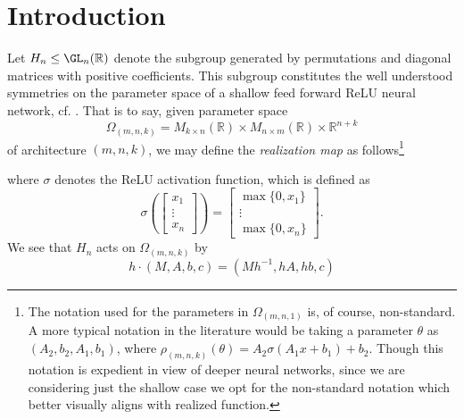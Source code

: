 \documentclass[11pt,letterpaper]{amsart}
\begin{document}
\section{Introduction}
\par Let $H_n\leq \GL_n(\mathbb{R})$ denote the subgroup generated by permutations and diagonal matrices with positive coefficients. This subgroup constitutes the well understood symmetries on the parameter space of a shallow feed forward ReLU neural network, cf. \cite{zhao2023symmetriesflatminimaconserved, godfrey2023symmetriesdeeplearningmodels}. That is to say, given parameter space 
$$
\Omega_{(m,n,k)} = M_{k\times n}(\mathbb{R})\times M_{n\times m}(\mathbb{R})\times \mathbb{R}^{n+k}
$$
of architecture $(m,n,k)$, we may define the \textit{realization map} as follows\footnote{The notation used for the parameters in $\Omega_{(m,n,1)}$ is, of course, non-standard. A more typical notation in the literature would be taking a parameter $\theta$ as $(A_2, b_2, A_1, b_1)$, where $\rho_{(m,n,k)}(\theta)=A_2\sigma(A_1x+b_1)+b_2$. Though this notation is expedient in view of deeper neural networks, since we are considering just the shallow case we opt for the non-standard notation which better visually aligns with realized function.}
\begin{center}
\end{center}
where $\sigma$ denotes the ReLU activation function, which is defined as 
$$
\sigma\left(\begin{bmatrix} x_1 \\ \vdots \\ x_{n}\end{bmatrix}\right) = \begin{bmatrix} \max\{0, x_1\} \\ \vdots \\ \max\{0, x_{n}\}\end{bmatrix}.
$$
We see that $H_n$ acts on $\Omega_{(m,n,k)}$ by
$$
h\cdot(M, A, b, c) = (Mh^{-1}, hA, hb, c)
$$
\end{document}
